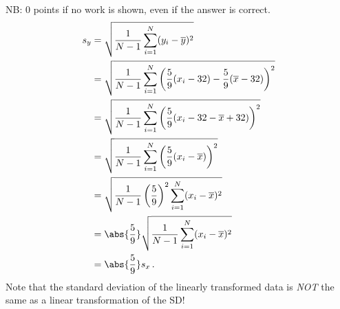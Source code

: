 \documentclass[11pt]{article}\usepackage[]{graphicx}\usepackage[]{color}
\renewcommand{\mean}[1]{\overline{#1}}
\renewcommand{\sd}[1]{s_{#1}}
\begin{document}
\begin{problems}
\begin{problem}
{\\NB: 0 points if no work is shown, even if the answer is correct.
\begin{align*}
\sd{y} &= \sqrt{\frac{1}{N-1} \sum_{i=1}^N (y_i - \mean{y})^2}\\
&= \sqrt{\frac{1}{N-1} \sum_{i=1}^N \left(\frac{5}{9}(x_i-32) - \frac{5}{9}(\mean{x}-32) \right)^2}\\
&= \sqrt{\frac{1}{N-1} \sum_{i=1}^N \left(\frac{5}{9}(x_i-32-\mean{x}+32)\right)^2}\\
&=\sqrt{\frac{1}{N-1} \sum_{i=1}^N \left(\frac{5}{9}(x_i-\mean{x})\right)^2}\\
&=\sqrt{\frac{1}{N-1} \left(\frac{5}{9}\right)^2  \sum_{i=1}^N (x_i-\mean{x})^2}\\
&=\abs{\frac{5}{9}} \sqrt{\frac{1}{N-1} \sum_{i=1}^N (x_i-\mean{x})^2}\\
&=\abs{\frac{5}{9}} \sd{x} \,.
\end{align*}
Note that the standard deviation of the linearly transformed data is \textit{NOT} the same as a linear transformation of the SD!
}
\end{problem}


\end{problems}
\end{document}
